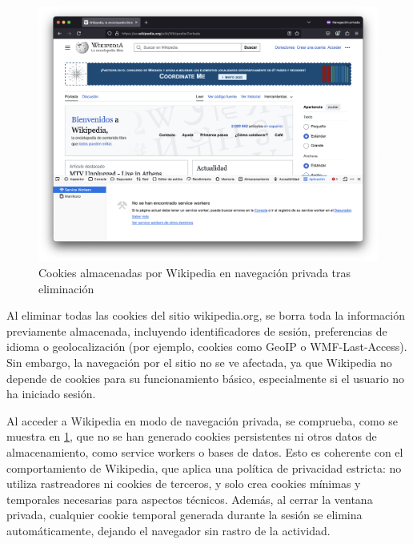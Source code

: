\begin{figure}[H]   
    \centering
    \includegraphics[width=\textwidth]{cookies_wiki_npriv.png}
    \caption{Cookies almacenadas por Wikipedia en navegación privada tras eliminación}
    \label{fig:cookies_wiki_npriv}
\end{figure}

Al eliminar todas las cookies del sitio wikipedia.org, se borra toda la información previamente almacenada, incluyendo identificadores de sesión, preferencias de idioma o geolocalización (por ejemplo, cookies como GeoIP o WMF-Last-Access). Sin embargo, la navegación por el sitio no se ve afectada, ya que Wikipedia no depende de cookies para su funcionamiento básico, especialmente si el usuario no ha iniciado sesión. 

Al acceder a Wikipedia en modo de navegación privada, se comprueba, como se muestra en \ref{fig:cookies_wiki_npriv}, que no se han generado cookies persistentes ni otros datos de almacenamiento, como service workers o bases de datos. Esto es coherente con el comportamiento de Wikipedia, que aplica una política de privacidad estricta: no utiliza rastreadores ni cookies de terceros, y solo crea cookies mínimas y temporales necesarias para aspectos técnicos. Además, al cerrar la ventana privada, cualquier cookie temporal generada durante la sesión se elimina automáticamente, dejando el navegador sin rastro de la actividad. 

